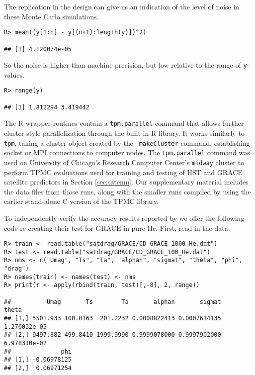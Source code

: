 \documentclass[12pt]{article}
\begin{document}
The replication in the design can give us an indication of the level of noise
in these Monte Carlo simulations.

{\singlespacing
\begin{verbatim}
R> mean((y[1:n] - y[(n+1):length(y)])^2)

## [1] 4.120074e-05
\end{verbatim}}

\noindent So the noise is higher than machine precision, but low relative to the range
of {\tt y}-values.

{\singlespacing
\begin{verbatim}
R> range(y)

## [1] 1.812294 3.419442
\end{verbatim}}

The {\sf R} wrapper routines contain a {\tt tpm.parallel} command that allows
further cluster-style parallelization through the built-in {\sf R} library. It
works similarly to {\tt tpm}, taking a cluster object created by the {\tt
makeCluster} command, establishing socket or MPI connections to computer
nodes.  The {\tt tpm.parallel} command was used on University of Chicago's
Research Computer Center's {\tt midway} cluster to perform TPMC evaluations
used for training and testing of HST and GRACE satellite predictors in Section
\ref{sec:satemu}.  Our supplementary material includes the data files from those
runs, along with the smaller runs compiled by \citet{metha:etal:2014} using
the earlier stand-alone {\sf C} version of the TPMC library.

To independently verify the accuracy results reported by \citet{metha:etal:2014} 
we offer the following code re-creating their test for GRACE in pure He. First, read 
in the data.

{\singlespacing
\begin{verbatim}
R> train <- read.table("satdrag/GRACE/CD_GRACE_1000_He.dat")
R> test <- read.table("satdrag/GRACE/CD_GRACE_100_He.dat")
R> nms <- c("Umag", "Ts", "Ta", "alphan", "sigmat", "theta", "phi", "drag")
R> names(train) <- names(test) <- nms
R> print(r <- apply(rbind(train, test)[,-8], 2, range))

##          Umag       Ts        Ta       alphan       sigmat        theta
## [1,] 5501.933 100.0163  201.2232 0.0008822413 0.0007614135 1.270032e-05
## [2,] 9497.882 499.8410 1999.9990 0.9999078000 0.9997902000 6.978310e-02
##              phi
## [1,] -0.06978125
## [2,]  0.06971254
\end{verbatim}}
\end{document}
